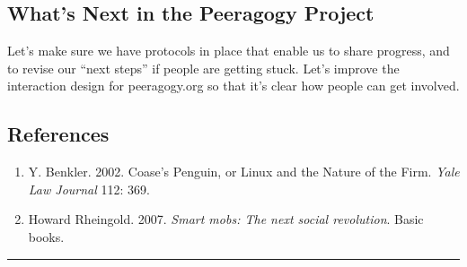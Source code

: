 \hypertarget{whats-next-in-the-peeragogy-project}{%
\subsection{What's Next in the Peeragogy
Project}\label{whats-next-in-the-peeragogy-project}}

Let's make sure we have protocols in place that enable us to share
progress, and to revise our ``next steps'' if people are getting stuck.
Let's improve the interaction design for peeragogy.org so that it's
clear how people can get involved.

\hypertarget{references}{%
\subsection{References}\label{references}}

\begin{enumerate}
\def\labelenumi{\arabic{enumi}.}
\item
  Y. Benkler. 2002. Coase's Penguin, or Linux and the Nature of the
  Firm. \emph{Yale Law Journal} 112: 369.
\item
  Howard Rheingold. 2007. \emph{Smart mobs: The next social revolution}.
  Basic books.
\end{enumerate}

\begin{center}\rule{0.5\linewidth}{0.5pt}\end{center}
